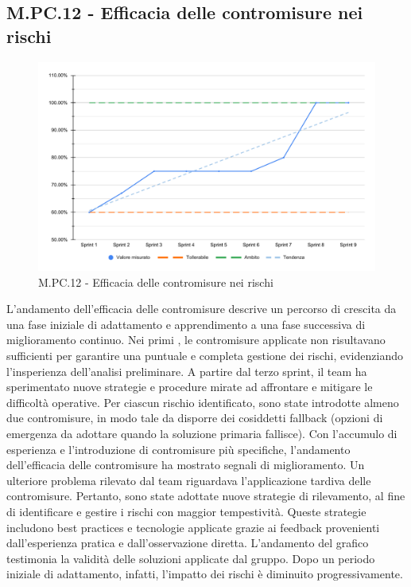 \subsection{M.PC.12 - Efficacia delle contromisure nei rischi}
\begin{figure}[H]
    \centering
    \includegraphics[width=\textwidth]{assets/efficacia_contromisure.pdf}
    \caption{M.PC.12 - Efficacia delle contromisure nei rischi}
\end{figure}

\par L'andamento dell'efficacia delle contromisure descrive un percorso di crescita da una fase iniziale di adattamento e apprendimento a una fase successiva di miglioramento continuo. Nei primi , le contromisure applicate non risultavano sufficienti per garantire una puntuale e completa gestione dei rischi, evidenziando l’insperienza dell'analisi preliminare. A partire dal terzo sprint, il team ha sperimentato nuove strategie e procedure mirate ad affrontare e mitigare le difficoltà operative. Per ciascun rischio identificato, sono state introdotte almeno due contromisure, in modo tale da disporre dei cosiddetti fallback (opzioni di emergenza da adottare quando la soluzione primaria fallisce). Con l'accumulo di esperienza e l’introduzione di contromisure più specifiche, l'andamento dell'efficacia delle contromisure ha mostrato segnali di miglioramento. Un ulteriore problema rilevato dal team riguardava l’applicazione tardiva delle contromisure. Pertanto, sono state adottate nuove strategie di rilevamento, al fine di identificare e gestire i rischi con maggior tempestività. Queste strategie includono best practices e tecnologie applicate grazie ai feedback provenienti dall'esperienza pratica e dall’osservazione diretta. L’andamento del grafico testimonia la validità delle soluzioni applicate dal gruppo. Dopo un periodo iniziale di adattamento, infatti, l'impatto dei rischi è diminuito progressivamente. 
